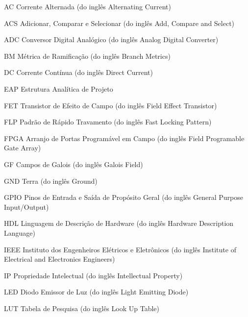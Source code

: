 \documentclass[
	12pt,				%
	openright,			%
	oneside,			%
	a4paper,			%
	hyphens,			%
	english,			%
	brazil				%
]{abntex2}
\newcommand{\listofcharts}{\listof{chart}{Lista de Gráficos}}
\begin{document}
	
	
	\listoffigures*
	\cleardoublepage
	
	\listofcharts
	\cleardoublepage
		
	\listoftables*
	\cleardoublepage
	
	\begin{siglas}
		\item[AC] Corrente Alternada (do inglês Alternating Current)
		\item[ACS] Adicionar, Comparar e Selecionar (do inglês Add, Compare and Select)
		\item[ADC] Conversor Digital Analógico (do inglês Analog Digital Converter)
		\item[BM] Métrica de Ramificação (do inglês Branch Metrics)
		\item[DC] Corrente Contínua (do inglês Direct Current)
		\item[EAP] Estrutura Analítica de Projeto
		\item[FET] Transistor de Efeito de Campo (do inglês Field Effect Transistor)
		\item[FLP] Padrão de Rápido Travamento (do inglês Fast Locking Pattern)
		\item[FPGA] Arranjo de Portas Programável em Campo (do inglês Field Programable Gate Array)
		\item[GF] Campos de Galois (do inglês Galois Field)
		\item[GND] Terra (do inglês Ground)
		\item[GPIO] Pinos de Entrada e Saída de Propósito Geral (do inglês General Purpose Input/Output)
		\item[HDL] Linguagem de Descrição de Hardware (do inglês Hardware Description Language)
		\item[IEEE] Instituto dos Engenheiros Elétricos e Eletrônicos (do inglês Institute of Electrical and Electronics Engineers)
		\item[IP] Propriedade Intelectual (do inglês Intellectual Property)
		\item[LED] Diodo Emissor de Luz (do inglês Light Emitting Diode)
		\item[LUT] Tabela de Pesquisa (do inglês Look Up Table)

\end{siglas}
\end{document}
